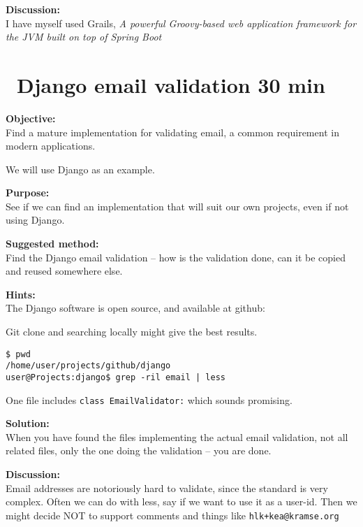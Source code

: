 \documentclass[a4paper,11pt,notitlepage]{report}
\begin{document}
{\bf Discussion:}\\
I have myself used Grails,
\emph{A powerful Groovy-based web application framework for the JVM built on top of Spring Boot}



\chapter{\faExclamationTriangle\ Django email validation 30 min}
\label{ex:django-email}



{\bf Objective:}\\
Find a mature implementation for validating email, a common requirement in modern applications.

We will use Django as an example.

{\bf Purpose:}\\
See if we can find an implementation that will suit our own projects, even if not using Django.

{\bf Suggested method:}\\
Find the Django email validation -- how is the validation done, can it be copied and reused somewhere else.

{\bf Hints:}\\
The Django software is open source, and available at github:\\

Git clone and searching locally might give the best results.

\begin{verbatim}
$ pwd
/home/user/projects/github/django
user@Projects:django$ grep -ril email | less
\end{verbatim}

One file includes \verb+class EmailValidator:+ which sounds promising.


{\bf Solution:}\\
When you have found the files implementing the actual email validation, not all related files, only the one doing the validation -- you are done.

{\bf Discussion:}\\
Email addresses are notoriously hard to validate, since the standard is very complex. Often we can do with less, say if we want to use it as a user-id. Then we might decide NOT to support comments and things like \verb?hlk+kea@kramse.org?
\end{document}
